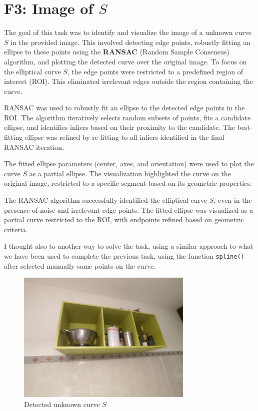 \section[F3: Image of \textit{S}]{F3: Image of $S$}
The goal of this task was to identify and visualize the image of a unknown curve $S$ in the provided image. This involved detecting edge points, robustly fitting an ellipse to these points using the \textbf{RANSAC} (Random Sample Consensus) algorithm, and plotting the detected curve over the original image. To focus on the elliptical curve $S$, the edge points were restricted to a predefined region of interest (ROI). This eliminated irrelevant edges outside the region containing the curve.

RANSAC was used to robustly fit an ellipse to the detected edge points in the ROI. The algorithm iteratively selects random subsets of points, fits a candidate ellipse, and identifies inliers based on their proximity to the candidate.
The best-fitting ellipse was refined by re-fitting to all inliers identified in the final RANSAC iteration.

The fitted ellipse parameters (center, axes, and orientation) were used to plot the curve $S$ as a partial ellipse. The visualization highlighted the curve on the original image, restricted to a specific segment based on its geometric properties.

The RANSAC algorithm successfully identified the elliptical curve $S$, even in the presence of noise and irrelevant edge points. The fitted ellipse was visualized as a partial curve restricted to the ROI, with endpoints refined based on geometric criteria.

I thought also to another way to solve the task, using a similar approach to what we have been used to complete the previous task, using the function \texttt{spline()} after selected manually some points on the curve.

\begin{figure}[H]
    \centering
    \includegraphics[width=0.75\textwidth]{img/imageProcessing/detected_s.jpg}
    \caption{Detected unknown curve $S$}
    \label{fig:detectS}
\end{figure}